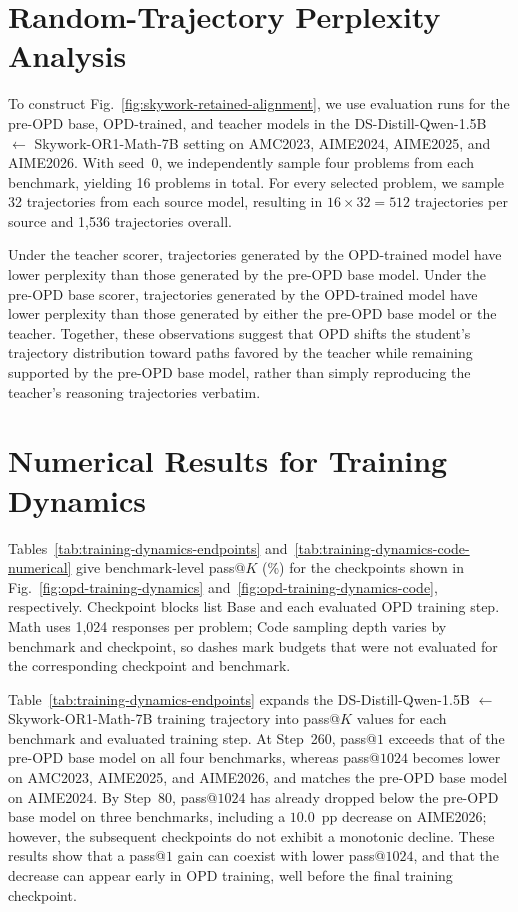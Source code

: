 \documentclass{article}
\theoremstyle{opdplain}
\begin{document}
\section{Random-Trajectory Perplexity Analysis}
\label{app:random-trajectory-ppl}

To construct Fig.~\ref{fig:skywork-retained-alignment}, we use evaluation
runs for the pre-OPD base, OPD-trained, and teacher models in the DS-Distill-Qwen-1.5B $\leftarrow$ Skywork-OR1-Math-7B setting on AMC2023,
AIME2024, AIME2025, and AIME2026. With seed~0, we independently sample four problems from
each benchmark, yielding 16 problems in total. For every selected problem,
we sample 32 trajectories from each source model, resulting in
$16\times 32=512$ trajectories per source and 1,536 trajectories overall.

Under the teacher scorer, trajectories generated by the OPD-trained model have
lower perplexity than those generated by the pre-OPD base model. Under the
pre-OPD base scorer, trajectories generated by the OPD-trained model have lower
perplexity than those generated by either the pre-OPD base model or the teacher.
Together, these observations suggest that OPD shifts the student's trajectory
distribution toward paths favored by the teacher while remaining supported by
the pre-OPD base model, rather than simply reproducing the teacher's reasoning
trajectories verbatim.

\section{Numerical Results for Training Dynamics}

Tables~\ref{tab:training-dynamics-endpoints} and~\ref{tab:training-dynamics-code-numerical} give benchmark-level pass@$K$ (\%) for the checkpoints shown in Fig.~\ref{fig:opd-training-dynamics} and~\ref{fig:opd-training-dynamics-code}, respectively. Checkpoint blocks list Base and each evaluated OPD training step. Math uses 1,024 responses per problem; Code sampling depth varies by benchmark and checkpoint, so dashes mark budgets that were not evaluated for the corresponding checkpoint and benchmark.

Table~\ref{tab:training-dynamics-endpoints} expands the DS-Distill-Qwen-1.5B $\leftarrow$ Skywork-OR1-Math-7B training trajectory into pass@$K$ values for each benchmark and evaluated training step. At Step~260, pass@$1$ exceeds that of the pre-OPD base model on all four benchmarks, whereas pass@$1024$ becomes lower on AMC2023, AIME2025, and AIME2026, and matches the pre-OPD base model on AIME2024. By Step~80, pass@$1024$ has already dropped below the pre-OPD base model on three benchmarks, including a $10.0$~pp decrease on AIME2026; however, the subsequent checkpoints do not exhibit a monotonic decline. These results show that a pass@$1$ gain can coexist with lower pass@$1024$, and that the decrease can appear early in OPD training, well before the final training checkpoint.
\end{document}
